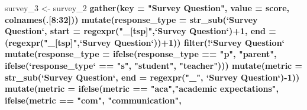\documentclass[]{article}
\newenvironment{Shaded}{\begin{snugshade}}{\end{snugshade}}
\newcommand{\DataTypeTok}[1]{\textcolor[rgb]{0.13,0.29,0.53}{#1}}
\newcommand{\DecValTok}[1]{\textcolor[rgb]{0.00,0.00,0.81}{#1}}
\newcommand{\KeywordTok}[1]{\textcolor[rgb]{0.13,0.29,0.53}{\textbf{#1}}}
\newcommand{\NormalTok}[1]{#1}
\newcommand{\OperatorTok}[1]{\textcolor[rgb]{0.81,0.36,0.00}{\textbf{#1}}}
\newcommand{\StringTok}[1]{\textcolor[rgb]{0.31,0.60,0.02}{#1}}
\begin{document}
\begin{Shaded}
\begin{Highlighting}[]
\NormalTok{survey_}\DecValTok{3}\NormalTok{ <-}\StringTok{ }\NormalTok{survey_}\DecValTok{2} \OperatorTok{%>%}
\StringTok{  }\KeywordTok{gather}\NormalTok{(}\DataTypeTok{key =} \StringTok{"Survey Question"}\NormalTok{, }\DataTypeTok{value =}\NormalTok{ score, }\KeywordTok{colnames}\NormalTok{(.[}\DecValTok{8}\OperatorTok{:}\DecValTok{32}\NormalTok{])) }\OperatorTok{%>%}
\StringTok{  }\KeywordTok{mutate}\NormalTok{(}\DataTypeTok{response_type =} \KeywordTok{str_sub}\NormalTok{(}\StringTok{`}\DataTypeTok{Survey Question}\StringTok{`}\NormalTok{, }\DataTypeTok{start =} \KeywordTok{regexpr}\NormalTok{(}\StringTok{"_[tsp]"}\NormalTok{,}\StringTok{`}\DataTypeTok{Survey Question}\StringTok{`}\NormalTok{)}\OperatorTok{+}\DecValTok{1}\NormalTok{,}
                                                             \DataTypeTok{end =}\NormalTok{ (}\KeywordTok{regexpr}\NormalTok{(}\StringTok{"_[tsp]"}\NormalTok{,}\StringTok{`}\DataTypeTok{Survey Question}\StringTok{`}\NormalTok{))}\OperatorTok{+}\DecValTok{1}\NormalTok{)) }\OperatorTok{%>%}
\StringTok{  }\KeywordTok{filter}\NormalTok{(}\OperatorTok{!}\StringTok{`}\DataTypeTok{Survey Question}\StringTok{`} \OperatorTok{%in%}\StringTok{ }\KeywordTok{c}\NormalTok{(}\StringTok{"aca_tot_11"}\NormalTok{,}\StringTok{"com_tot_11"}\NormalTok{,}\StringTok{"eng_tot_11"}\NormalTok{,}\StringTok{"saf_tot_11"}\NormalTok{)) }\OperatorTok{%>%}
\StringTok{  }\KeywordTok{mutate}\NormalTok{(}\DataTypeTok{response_type =} \KeywordTok{ifelse}\NormalTok{(response_type }\OperatorTok{==}\StringTok{ "p"}\NormalTok{, }\StringTok{"parent"}\NormalTok{,}
                                \KeywordTok{ifelse}\NormalTok{(}\StringTok{`}\DataTypeTok{response_type}\StringTok{`} \OperatorTok{==}\StringTok{ "s"}\NormalTok{, }\StringTok{"student"}\NormalTok{, }\StringTok{"teacher"}\NormalTok{))) }\OperatorTok{%>%}
\StringTok{  }\KeywordTok{mutate}\NormalTok{(}\DataTypeTok{metric =} \KeywordTok{str_sub}\NormalTok{(}\StringTok{`}\DataTypeTok{Survey Question}\StringTok{`}\NormalTok{, }\DataTypeTok{end =} \KeywordTok{regexpr}\NormalTok{(}\StringTok{"_"}\NormalTok{, }\StringTok{`}\DataTypeTok{Survey Question}\StringTok{`}\NormalTok{)}\OperatorTok{-}\DecValTok{1}\NormalTok{)) }\OperatorTok{%>%}
\StringTok{  }\KeywordTok{mutate}\NormalTok{(}\DataTypeTok{metric =} \KeywordTok{ifelse}\NormalTok{(metric }\OperatorTok{==}\StringTok{ "aca"}\NormalTok{,}\StringTok{"academic expectations"}\NormalTok{,}
                         \KeywordTok{ifelse}\NormalTok{(metric }\OperatorTok{==}\StringTok{ "com"}\NormalTok{, }\StringTok{"communication"}\NormalTok{,}
}}}}}}
\end{Highlighting}
\end{Shaded}
\end{document}

